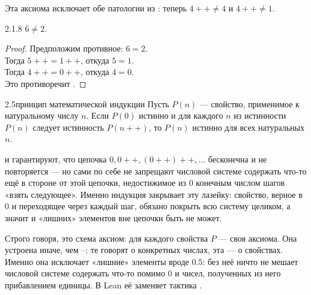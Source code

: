 \begin{remark}
Эта аксиома исключает обе патологии из : теперь
$4{+}{+} \neq 4$ и $4{+}{+} \neq 1$.
\end{remark}

\begin{proposition}{2.1.8}{}
$6 \neq 2$.
\end{proposition}

\begin{proof}
Предположим противное: $6 = 2$.\\
Тогда $5{+}{+} = 1{+}{+}$, откуда $5 = 1$.\\
Тогда $4{+}{+} = 0{+}{+}$, откуда $4 = 0$.\\
Это противоречит .
\end{proof}

\begin{axiom}{2.5}{принцип математической индукции}
Пусть $P(n)$ — свойство, применимое к натуральному числу $n$. Если $P(0)$ истинно и для
каждого $n$ из истинности $P(n)$ следует истинность $P(n{+}{+})$, то $P(n)$ истинно для
всех натуральных $n$.
\end{axiom}

\begin{intuition}
 и  гарантируют, что цепочка $0,0{+}{+},(0{+}{+}){+}{+},\ldots$ бесконечна и
не повторяется — но сами по себе не запрещают числовой системе содержать что-то ещё в
стороне от этой цепочки, недостижимое из $0$ конечным числом шагов «взять следующее». Именно
индукция закрывает эту лазейку: свойство, верное в $0$ и переходящее через каждый шаг,
обязано покрыть всю систему целиком, а значит и «лишних» элементов вне цепочки быть не может.
\end{intuition}

\begin{remark}
Строго говоря, это схема аксиом: для каждого свойства $P$ — своя аксиома. Она устроена
иначе, чем –: те говорят о конкретных
числах, эта — о свойствах. Именно она исключает «лишние» элементы вроде $0.5$:
без неё ничто не мешает числовой системе содержать что-то помимо $0$ и чисел, полученных из
него прибавлением единицы. В Lean её заменяет тактика .
\end{remark}

